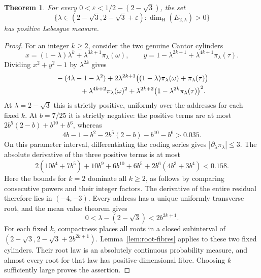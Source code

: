 \documentclass[11pt,a4paper]{amsart}
\numberwithin{equation}{section}
\newtheorem{theorem}{Theorem}[section]
\theoremstyle{definition}
\begin{document}
\begin{theorem}\label{thm:circle-positive-measure}
For every \(0<\varepsilon<1/2-(2-\sqrt3)\), the set
\[
\{\lambda\in(2-\sqrt3,2-\sqrt3+\varepsilon):
                       \dim_{\mathrm H}(E_{2,\lambda})>0\}
\]
has positive Lebesgue measure.
\end{theorem}
\begin{proof}
For an integer \(k\geq2\), consider the two genuine Cantor cylinders
\[
x=(1-\lambda)\lambda^k+\lambda^{3k+1}\pi_\lambda(\omega),
\qquad
y=1-\lambda^{2k+1}+\lambda^{4k+1}\pi_\lambda(\tau).
\]
Dividing \(x^2+y^2-1\) by \(\lambda^{2k}\) gives
\begin{align*}
&-(4\lambda-1-\lambda^2)
 +2\lambda^{2k+1}\bigl((1-\lambda)\pi_\lambda(\omega)
                                      +\pi_\lambda(\tau)\bigr)\\
&\hspace{12mm}
 +\lambda^{4k+2}\pi_\lambda(\omega)^2
 +\lambda^{2k+2}
             \bigl(1-\lambda^{2k}\pi_\lambda(\tau)\bigr)^2 .
\end{align*}
At \(\lambda=2-\sqrt3\) this is strictly positive, uniformly
over the addresses for each fixed \(k\). At \(b=7/25\) it is
strictly negative: the positive terms are at most
\(2b^5(2-b)+b^{10}+b^6\), whereas
\[
4b-1-b^2-2b^5(2-b)-b^{10}-b^6>0.035.
\]
On this parameter interval, differentiating the coding series
gives \(|\partial_\lambda\pi_\lambda|\leq3\).
The absolute derivative of the three positive terms is at most
\[
2(10b^4+7b^5)+10b^9+6b^{10}+6b^5
                         +2b^6(4b^3+3b^4)<0.158 .
\]
Here the bounds for \(k=2\) dominate all \(k\geq2\), as follows
by comparing consecutive powers and their integer factors.
The derivative of the entire residual therefore lies in
\((-4,-3)\). Every address has a unique uniformly transverse
root, and the mean value theorem gives
\[
0<\lambda-(2-\sqrt3)<2b^{2k+1}.
\]
For each fixed \(k\), compactness places all roots in a closed
subinterval of \((2-\sqrt3,2-\sqrt3+2b^{2k+1})\).
Lemma~\ref{lem:root-fibres} applies to these two fixed cylinders.
Their root law is an absolutely continuous probability measure,
and almost every root for that law has positive-dimensional
fibre. Choosing \(k\) sufficiently large proves the assertion.
\end{proof}
\end{document}
